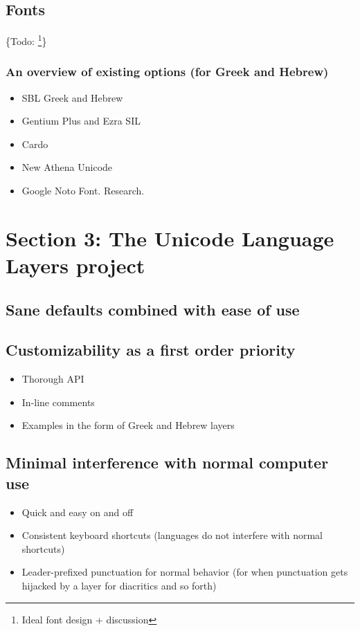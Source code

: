 \documentclass[11pt]{article}
\begin{document}
\subsection{Fonts}
\label{sec:org1c529a8}

\{Todo: \footnote{Ideal font design + discussion}\}

\subsubsection{An overview of existing options (for Greek and Hebrew)}
\label{sec:org268693a}

\begin{itemize}
\item SBL Greek and Hebrew
\item Gentium Plus and Ezra SIL
\item Cardo
\item New Athena Unicode
\item Google Noto Font. Research.
\end{itemize}

\section{Section 3: The Unicode Language Layers project}
\label{sec:org921f646}

\subsection{Sane defaults combined with ease of use}
\label{sec:org1446aef}

\subsection{Customizability as a first order priority}
\label{sec:org27fa8df}

\begin{itemize}
\item Thorough API
\item In-line comments
\item Examples in the form of Greek and Hebrew layers
\end{itemize}

\subsection{Minimal interference with normal computer use}
\label{sec:org3d52549}

\begin{itemize}
\item Quick and easy on and off
\item Consistent keyboard shortcuts (languages do not interfere with normal shortcuts)
\item Leader-prefixed punctuation for normal behavior (for when punctuation gets hijacked by a layer for diacritics and so forth)
\end{itemize}
\end{document}
